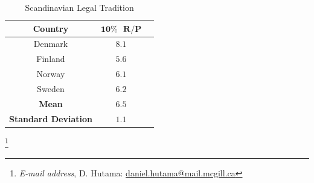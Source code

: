 \documentclass[12pt]{article}
\begin{document}
\begin{table}[htbp!]
	\caption{Scandinavian Legal Tradition}
	\centering
		\begin{tabular}{ccc}
			\textbf{Country} & $\mathbf{10\% \text{ } R/P}$ &\\
			  \hline
			Denmark&$8.1$\\
			Finland&$5.6$\\
			Norway&$6.1$\\
			Sweden&$6.2$\\
            \hline
            \textbf{Mean}&$\mathbf{6.5}$\\
            \textbf{Standard Deviation}&$\mathbf{1.1}$\\
			\hline
		\end{tabular}
\end{table}

\newcommand\blfootnote[1]{%
  \begingroup
  \renewcommand\thefootnote{}\footnote{#1}%
  \addtocounter{footnote}{-1}%
  \endgroup
}

\blfootnote{
\textit{E-mail address}, D. Hutama: \quad \href{mailto:daniel.hutama@mail.mcgill.ca}{daniel.hutama@mail.mcgill.ca}}
\end{document}
